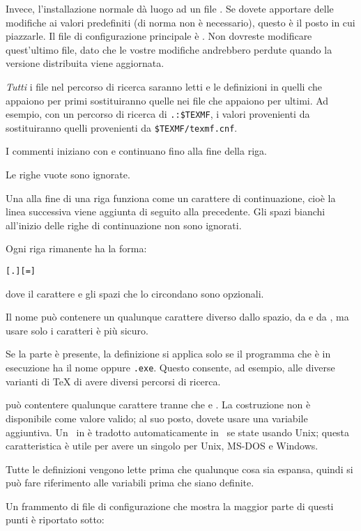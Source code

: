\documentclass{article}
\begin{document}
Invece, l'installazione normale dà luogo ad un file
. Se dovete apportare delle modifiche ai valori
predefiniti (di norma non è necessario), questo è il posto in cui
piazzarle. Il file di configurazione principale è
. Non dovreste modificare
quest'ultimo file, dato che le vostre modifiche andrebbero perdute quando
la versione distribuita viene aggiornata.

\emph{Tutti} i file  nel percorso di ricerca saranno letti
e le definizioni in quelli che appaiono per primi sostituiranno quelle nei
file che appaiono per ultimi. Ad esempio, con un percorso di ricerca di
\verb|.:$TEXMF|, i valori provenienti da  sostituiranno
quelli provenienti da \verb|$TEXMF/texmf.cnf|.

\begin{itemize*}
\item
  I commenti iniziano con \code{\%} e continuano fino alla fine della
  riga.
\item
  Le righe vuote sono ignorate.
\item
  Una \bs{} alla fine di una riga funziona come un carattere di
  continuazione, cioè la linea successiva viene aggiunta di seguito alla
  precedente. Gli spazi bianchi
  all'inizio delle righe di continuazione non sono ignorati.
\item
  Ogni riga rimanente ha la forma:
\begin{alltt}
  [.] [=] 
\end{alltt}
  dove il carattere \samp{=} e gli spazi che lo circondano sono opzionali.
\item
  Il nome  può contenere un qualunque carattere diverso
  dallo spazio, da \samp{=} e da , ma usare solo i caratteri
   è più sicuro.
\item
  Se la parte  è presente, la definizione si
  applica solo se il programma che è in esecuzione ha il nome
  \texttt{} oppure \texttt{.exe}.
  Questo consente, ad esempio, alle diverse varianti di \TeX{} di avere
  diversi percorsi di ricerca.
\item {} può contentere qualunque carattere tranne che \code{\%}
  e . La costruzione 
  non è disponibile come valore valido; al suo posto, dovete usare una
  variabile aggiuntiva. Un \samp{;}\ in  è tradotto
  automaticamente in \samp{:}\ se state usando Unix; questa caratteristica
  è utile per avere un singolo  per Unix, MS-DOS e
  Windows.
\item
  Tutte le definizioni vengono lette prima che qualunque cosa sia espansa,
  quindi si può fare riferimento alle variabili prima che siano definite.
\end{itemize*}
Un frammento di file di configurazione che mostra la maggior parte di
questi punti è
\ifSingleColumn
riportato sotto:
\end{document}
